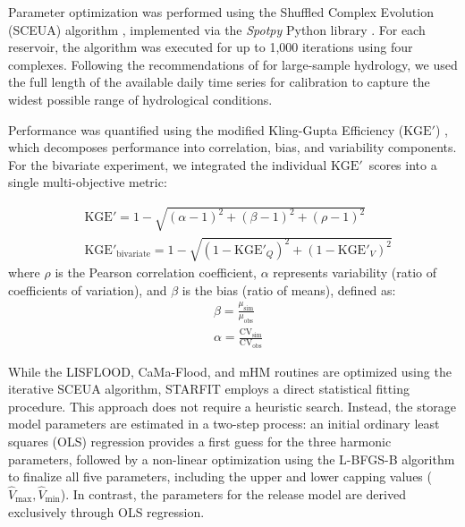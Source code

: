 \documentclass[hess, manuscript]{copernicus}
\newcommand{\KGEmod}{$\text{KGE}'$}
\begin{document}
Parameter optimization was performed using the Shuffled Complex Evolution (SCEUA) algorithm \citep{Duan1993, Duan1994}, implemented via the \textit{Spotpy} Python library \citep{Houska2015}. For each reservoir, the algorithm was executed for up to 1,000 iterations using four complexes. Following the recommendations of \citet{Shen2024} for large-sample hydrology, we used the full length of the available daily time series for calibration to capture the widest possible range of hydrological conditions.

Performance was quantified using the modified Kling-Gupta Efficiency (\KGEmod) \citep{kling2012}, which decomposes performance into correlation, bias, and variability components. For the bivariate experiment, we integrated the individual \KGEmod\ scores into a single multi-objective metric:

{\small
\begin{subequations}
    \label{eq:metrics}
    \begin{align}
        &\text{KGE}' = 1 - \sqrt{(\alpha - 1)^2+ (\beta - 1)^2 + (\rho - 1)^2 } \label{eq:kge} \\
        &\text{KGE}'_{\text{bivariate}} = 1 - \sqrt{(1 - \text{KGE}'_Q)^2 + (1 - \text{KGE}'_V)^2} \label{eq:kge_bivariate}
    \end{align}
\end{subequations}
}
where $\rho$ is the Pearson correlation coefficient, $\alpha$ represents variability (ratio of coefficients of variation), and $\beta$ is the bias (ratio of means), defined as:
{\small
\begin{align}
    &\beta = \frac{\mu_{\text{sim}}}{\mu_{\text{obs}}} \label{eq:kge_beta} \\
    &\alpha = \frac{\text{CV}_{\text{sim}}}{\text{CV}_{\text{obs}}} \label{eq:kge_alpha}
\end{align}
}

While the LISFLOOD, CaMa-Flood, and mHM routines are optimized using the iterative SCEUA algorithm, STARFIT employs a direct statistical fitting procedure. This approach does not require a heuristic search. Instead, the storage model parameters are estimated in a two-step process: an initial ordinary least squares (OLS) regression provides a first guess for the three harmonic parameters, followed by a non-linear optimization using the L-BFGS-B algorithm to finalize all five parameters, including the upper and lower capping values ($\hat{V}_{\max}, \hat{V}_{\min}$). In contrast, the parameters for the release model are derived exclusively through OLS regression.
\end{document}

